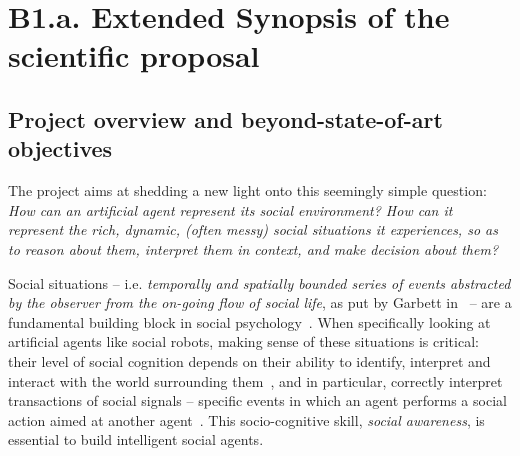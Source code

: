 
\newrefsection


\chapter{B1.a. Extended Synopsis of the scientific proposal}\label{part1}




\section{Project overview and beyond-state-of-art objectives}

The \project project aims at shedding a new light onto this seemingly simple
question: \emph{How can an artificial agent represent its social environment?
How can it represent the rich, dynamic, (often messy) social situations it
experiences, so as to reason about them, interpret them in context, and make
decision about them?}

Social situations -- i.e. \emph{temporally and spatially bounded series of
events abstracted by the observer from the on-going flow of social life}, as put
by Garbett in~\cite{garbett1970analysis} -- are a fundamental building block in
social psychology~\cite{argyle1981social}. When specifically looking at
artificial agents like social robots, making sense of these situations is
critical: their level of social cognition depends on their ability to identify,
interpret and interact with the world surrounding
them~\cite{szczepanowski2017computational}, and in particular, correctly
interpret transactions of social signals -- specific events in which an agent
performs a social action aimed at another agent~\cite{pantic2011social}. This
socio-cognitive skill, \emph{social awareness}, is essential to build
intelligent social agents.

